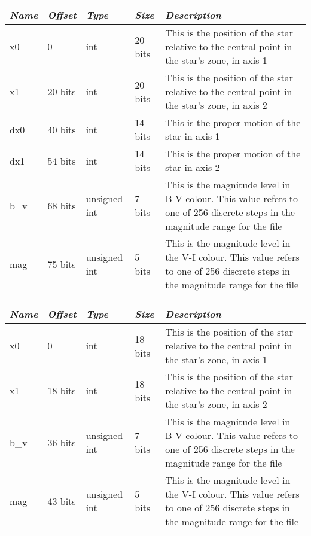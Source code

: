 \begin{longtabu} to \textwidth {l l l l X}\toprule
\emph{Name} & \emph{Offset}& \emph{Type} & \emph{Size} &\emph{Description}\\\midrule
x0   &  0      & int          & 20 bits & This is the position of the star relative to the central point in the star's zone, in axis 1\\\midrule
x1   & 20 bits & int          & 20 bits & This is the position of the star relative to the central point in the star's zone, in axis 2\\\midrule
dx0  & 40 bits & int          & 14 bits & This is the proper motion of the star in axis 1\\\midrule
dx1  & 54 bits & int          & 14 bits & This is the proper motion of the star in axis 2\\\midrule
b\_v & 68 bits & unsigned int &  7 bits & This is the magnitude level in B-V colour. This value refers to one of 256 discrete steps in the magnitude range for the file\\\midrule
mag  & 75 bits & unsigned int &  5 bits & This is the magnitude level in the V-I colour. This value refers to one of 256 discrete steps in the magnitude range for the file\\\bottomrule
\end{longtabu}

\begin{longtabu} to \textwidth {l l l l X}\toprule
\emph{Name} & \emph{Offset} & \emph{Type} & \emph{Size} & \emph{Description}\\\midrule
x0   & 0       & int          & 18 bits & This is the position of the star relative to the central point in the star's zone, in axis 1\\\midrule
x1   & 18 bits & int          & 18 bits & This is the position of the star relative to the central point in the star's zone, in axis 2\\\midrule
b\_v & 36 bits & unsigned int &  7 bits & This is the magnitude level in B-V colour. This value refers to one of 256 discrete steps 
                                          in the magnitude range for the file\\\midrule
mag  & 43 bits & unsigned int &  5 bits & This is the magnitude level in the V-I colour. This value refers to one of 256 discrete steps 
                                          in the magnitude range for the file\\\bottomrule
\end{longtabu}

